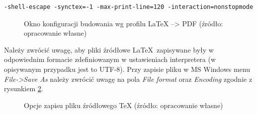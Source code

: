 \begin{lstlisting}[language=TeX, frame=single, caption = {Zawartość pola \textit{Command line arguments to pass to the compiler}}, label = {}]
-shell-escape -synctex=-1 -max-print-line=120 -interaction=nonstopmode "%wm" 
\end{lstlisting}


 \begin{figure}[ht]
  \centering
  \caption{Okno konfiguracji budowania wg profilu LaTeX --> PDF (źródło: opracowanie własne)}
  \label{fig:build01}
\end{figure}

Należy zwrócić uwagę, aby pliki źródłowe \LaTeX\ zapisywane były w odpowiednim formacie zdefiniowanym w ustawieniach interpretera (w opisywanym przypadku jest to UTF-8). Przy zapisie pliku w MS Windows menu \textit{File->Save As} należy zwrócić uwagę na pola \textit{File format} oraz \textit{Encoding} zgodnie z rysunkiem \ref{fig:save01}.


\begin{figure}[ht]
  \centering
  \caption{Opcje zapisu pliku źródłowego TeX (źródło: opracowanie własne)}
  \label{fig:save01}
\end{figure}

